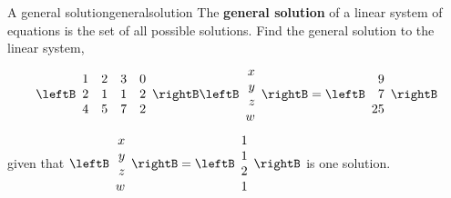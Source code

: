 \begin{example}{A general solution}{generalsolution}
The \textbf{general solution} of a linear system of equations 
is the set of
all possible solutions. Find the general solution to the linear system,
\begin{equation*}
\leftB
\begin{array}{rrrr}
1 & 2 & 3 & 0 \\
2 & 1 & 1 & 2 \\
4 & 5 & 7 & 2
\end{array}
\rightB \leftB
\begin{array}{r}
x \\
y \\
z \\
w
\end{array}
\rightB =\leftB
\begin{array}{r}
9 \\
7 \\
25
\end{array}
\rightB
\end{equation*}
given that $\leftB
\begin{array}{r}
x \\
y \\
z \\
w
\end{array}
\rightB=\leftB
\begin{array}{r}
1 \\
1 \\
2 \\
1
\end{array}
\rightB$ is one solution.
\end{example}

